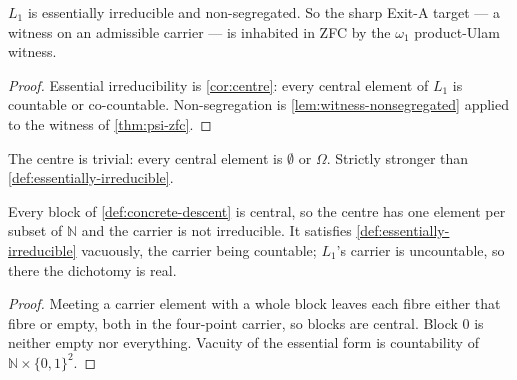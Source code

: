 \begin{theorem}
  \label{thm:l1-admissible}
  \leanok
  $L_1$ is essentially irreducible and non-segregated. So the sharp Exit-A
  target --- a witness on an admissible carrier --- is inhabited in ZFC by the
  $\omega_1$ product-Ulam witness.
\end{theorem}

\begin{proof}
  \leanok
  Essential irreducibility is \ref{cor:centre}: every central element of $L_1$ is
  countable or co-countable. Non-segregation is \ref{lem:witness-nonsegregated}
  applied to the witness of \ref{thm:psi-zfc}.
\end{proof}

\begin{definition}
  \label{def:irreducible}
  \leanok
  The centre is trivial: every central element is $\emptyset$ or $\Omega$.
  Strictly stronger than \ref{def:essentially-irreducible}.
\end{definition}

\begin{theorem}
  \label{thm:descent-not-irreducible}
  \leanok
  Every block of \ref{def:concrete-descent} is central, so the centre has one
  element per subset of $\mathbb{N}$ and the carrier is not irreducible. It
  satisfies \ref{def:essentially-irreducible} vacuously, the carrier being
  countable; $L_1$'s carrier is uncountable, so there the dichotomy is real.
\end{theorem}

\begin{proof}
  \leanok
  Meeting a carrier element with a whole block leaves each fibre either that
  fibre or empty, both in the four-point carrier, so blocks are central. Block
  $0$ is neither empty nor everything. Vacuity of the essential form is
  countability of $\mathbb{N} \times \{0,1\}^{2}$.
\end{proof}



